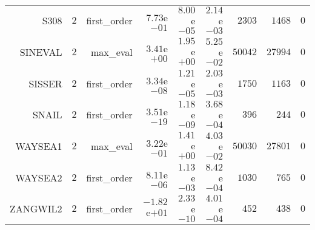 \begin{longtable}{rrrrrrrrr}
S308 & \(     2\) & first\_order & \( 7.73\)e\(-01\) & \( 8.00\)e\(-05\) & \( 2.14\)e\(-03\) & \(  2303\) & \(  1468\) & \(     0\) \\
SINEVAL & \(     2\) & max\_eval & \( 3.41\)e\(+00\) & \( 1.95\)e\(+00\) & \( 5.25\)e\(-02\) & \( 50042\) & \( 27994\) & \(     0\) \\
SISSER & \(     2\) & first\_order & \( 3.34\)e\(-08\) & \( 1.21\)e\(-05\) & \( 2.03\)e\(-03\) & \(  1750\) & \(  1163\) & \(     0\) \\
SNAIL & \(     2\) & first\_order & \( 3.51\)e\(-19\) & \( 1.18\)e\(-09\) & \( 3.68\)e\(-04\) & \(   396\) & \(   244\) & \(     0\) \\
WAYSEA1 & \(     2\) & max\_eval & \( 3.22\)e\(-01\) & \( 1.41\)e\(+00\) & \( 4.03\)e\(-02\) & \( 50030\) & \( 27801\) & \(     0\) \\
WAYSEA2 & \(     2\) & first\_order & \( 8.11\)e\(-06\) & \( 1.13\)e\(-03\) & \( 8.42\)e\(-04\) & \(  1030\) & \(   765\) & \(     0\) \\
ZANGWIL2 & \(     2\) & first\_order & \(-1.82\)e\(+01\) & \( 2.33\)e\(-10\) & \( 4.01\)e\(-04\) & \(   452\) & \(   438\) & \(     0\) \\\hline
\end{longtable}
